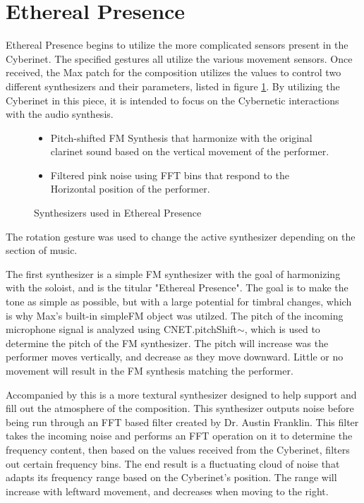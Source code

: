 \section{Ethereal Presence}
Ethereal Presence  begins to utilize the more complicated sensors present in the Cyberinet. The specified gestures all utilize the various movement sensors. Once received, the Max patch for the composition utilizes the values to control two different synthesizers and their parameters, listed in figure \ref{fig:etherealSynths}. By utilizing the Cyberinet in this piece, it is intended to focus on the Cybernetic interactions with the audio synthesis. 

\begin{figure}
    \centering
\begin{itemize}
    \item Pitch-shifted FM Synthesis that harmonize with the original clarinet sound based on the vertical movement of the performer.
    \item Filtered pink noise using FFT bins that respond to the Horizontal position of the performer.
\end{itemize}
    \caption{Synthesizers used in Ethereal Presence}
    \label{fig:etherealSynths}
\end{figure}

The rotation gesture was used to change the active synthesizer depending on the section of music.

The first synthesizer is a simple FM synthesizer with the goal of harmonizing with the soloist, and is the titular "Ethereal Presence". The goal is to make the tone as simple as possible, but with a large potential for timbral changes, which is why Max's built-in simpleFM object was utilzed. The pitch of the incoming microphone signal is analyzed using CNET.pitchShift$\sim$, which is used to determine the pitch of the FM synthesizer. The pitch will increase was the performer moves vertically, and decrease as they move downward. Little or no movement will result in the FM synthesis matching the performer.

Accompanied by this is a more textural synthesizer designed to help support and fill out the atmosphere of the composition. This synthesizer outputs noise before being run through an FFT based filter created by Dr. Austin Franklin\cite{pnpMaxTools}. This filter takes the incoming noise and performs an FFT operation on it to determine the frequency content, then based on the values received from the Cyberinet, filters out certain frequency bins. The end result is a fluctuating cloud of noise that adapts its frequency range based on the Cyberinet's position. The range will increase with leftward movement, and decreases when moving to the right.


